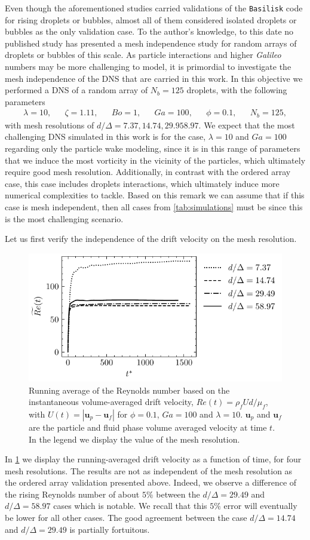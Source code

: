 Even though the aforementioned studies carried validations of the \texttt{Basilisk} code for rising droplets or bubbles, almost all of them considered isolated droplets or bubbles as the only validation case. 
To the author's knowledge, to this date no published study has presented a mesh independence study for random arrays of droplets or bubbles of this scale. 
As particle interactions and higher \textit{Galileo} numbers may be more challenging to model, it is primordial to investigate the mesh independence of the DNS that are carried in this work. 
In this objective we performed a DNS of a random array of $N_b=125$ droplets, with the following parameters
\begin{align*}
    \lambda = 10,
    && \zeta = 1.11,
    && Bo = 1,
    && Ga = 100,
    && \phi = 0.1,
    && N_b =125,
\end{align*}
with mesh resolutions of $d/\Delta = 7.37, 14.74, 29.9 58.97$. 
We expect that the most challenging DNS simulated in this work is for the case, $\lambda = 10$ and $Ga = 100$ regarding only the particle wake modeling,  since it is in this range of parameters that we induce the most vorticity in the vicinity of the particles, which ultimately require good mesh resolution. 
Additionally, in contrast with the ordered array case, this case includes droplets interactions, which ultimately induce more numerical complexities to tackle. 
Based on this remark we can assume that if this case is mesh independent, then all cases from \ref{tab:simulations} must be since this is the most challenging scenario.   

Let us first verify the independence of the drift velocity on the mesh resolution. 
\begin{figure}[h!]
    \centering
    \includegraphics[height = 0.3\textwidth]{image/HOMOGENEOUS_NEW/VAL/Re.pdf}
    \caption{
        Running average of the Reynolds number based on the instantaneous volume-averaged drift velocity, $Re(t) = \rho_fU d /\mu_f$, with $U(t) = |\textbf{u}_p - \textbf{u}_f|$ for $\phi = 0.1$, $Ga=100$ and $\lambda =10$.
        $\textbf{u}_p$ and $\textbf{u}_f$ are the particle and fluid phase volume averaged velocity at time $t$.
        In the legend we display the value of the mesh resolution. 
    }
    \label{fig:Re}
\end{figure}
In \ref{fig:Re} we display the running-averaged drift velocity as a function of time, for four mesh resolutions. 
The results are not as independent of the mesh resolution as the ordered array validation presented above. 
Indeed, we observe a difference of the rising Reynolds number of about $5\%$ between the $d/\Delta = 29.49$ and $d/\Delta = 58.97$ cases which is notable.
We recall that this $5\%$ error will eventually be lower for all other cases. 
The good agreement between the case  $d/\Delta = 14.74$ and $d/\Delta = 29.49$ is partially fortuitous.

